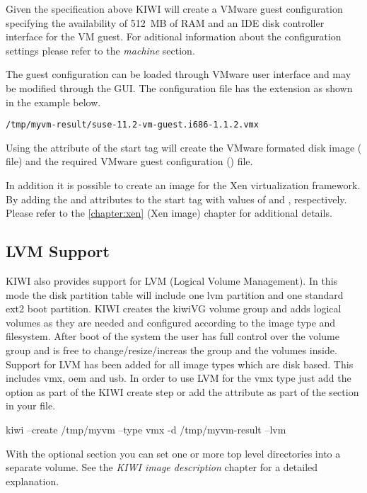 Given the specification above KIWI will create a VMware guest
configuration specifying the availability of 512~MB of RAM and an IDE 
disk controller interface for the VM guest. For aditional information
about the configuration settings please refer to the 
\textit{machine} section. 

The guest configuration can be loaded through VMware user interface and 
may be modified through the GUI. The configuration file has the  
extension as shown in the example below.

\begin{verbatim}
/tmp/myvm-result/suse-11.2-vm-guest.i686-1.1.2.vmx
\end{verbatim}

Using the  attribute of the  start tag
will create the VMware formated disk image ( file) and the required 
VMware guest configuration () file.

In addition it is possible to create an image for the Xen virtualization 
framework.  By adding the  and  
attributes to the  start tag with values of  and
, 
respectively. Please refer to the \ref{chapter:xen} (Xen image) chapter 
for additional details.

\subsection{LVM Support}
KIWI also provides support for LVM (Logical Volume Management). In this
mode the disk partition table will include one lvm partition and one
standard ext2 boot partition. KIWI creates the kiwiVG volume group and
adds logical volumes as they are needed and configured according to the
image type and filesystem. After boot of the system the user has full
control over the volume group and is free to change/resize/increas the
group and the volumes inside. Support for LVM has been added for all
image types which are disk based. This includes vmx, oem and usb.
In order to use LVM for the vmx type just add the  option
as part of the KIWI create step or add the attribute 
as part of the  section in your  file.

\begin{Command}{12cm}
kiwi --create /tmp/myvm --type vmx -d /tmp/myvm-result --lvm
\end{Command}

With the optional  section you can set one or
more top level directories into a separate volume. See the
\textit{KIWI image description} chapter for a detailed explanation.

